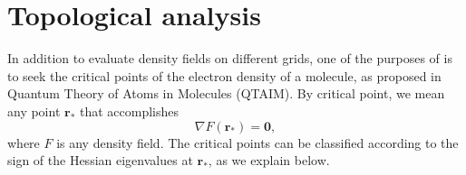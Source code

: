 

\chapter{Topological analysis}\label{sec:topolanalysis}

In addition to evaluate density fields on different grids, one of the purposes of \DTK{} is to seek the critical points of the electron density of a molecule, as proposed in Quantum Theory of Atoms in Molecules (QTAIM). By critical point, we mean any point $\boldsymbol{r}_*$ that accomplishes
%
\begin{equation}
   \nabla F(\boldsymbol{r}_*)=\boldsymbol{0},
\end{equation}
%
where $F$ is any density field. The critical points can be classified according to the sign of the Hessian eigenvalues at $\boldsymbol{r}_*$, as we explain below. 

